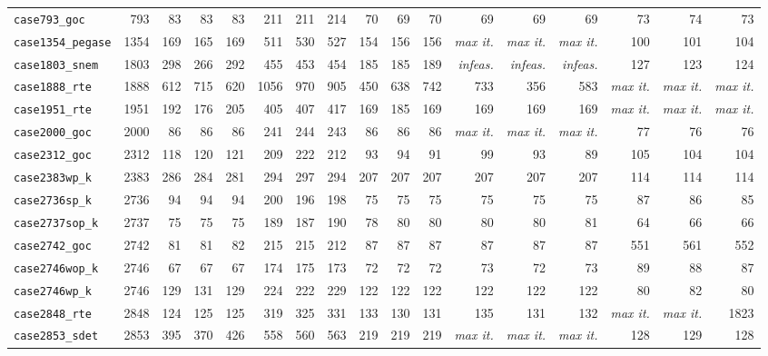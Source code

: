 {\begin{longtable}{lrrrrrrrrrrrrrrrr}
\texttt{case793\_goc} & 793 & 83 & 83 & 83 & 211 & 211 & 214 & 70 & 69 & 70 & 69 & 69 & 69 & 73 & 74 & 73 \\
\texttt{case1354\_pegase} & 1354 & 169 & 165 & 169 & 511 & 530 & 527 & 154 & 156 & 156 & \textit{max it.} & \textit{max it.} & \textit{max it.} & 100 & 101 & 104 \\
\texttt{case1803\_snem} & 1803 & 298 & 266 & 292 & 455 & 453 & 454 & 185 & 185 & 189 & \textit{infeas.} & \textit{infeas.} & \textit{infeas.} & 127 & 123 & 124 \\
\texttt{case1888\_rte} & 1888 & 612 & 715 & 620 & 1056 & 970 & 905 & 450 & 638 & 742 & 733 & 356 & 583 & \textit{max it.} & \textit{max it.} & \textit{max it.} \\
\texttt{case1951\_rte} & 1951 & 192 & 176 & 205 & 405 & 407 & 417 & 169 & 185 & 169 & 169 & 169 & 169 & \textit{max it.} & \textit{max it.} & \textit{max it.} \\
\texttt{case2000\_goc} & 2000 & 86 & 86 & 86 & 241 & 244 & 243 & 86 & 86 & 86 & \textit{max it.} & \textit{max it.} & \textit{max it.} & 77 & 76 & 76 \\
\texttt{case2312\_goc} & 2312 & 118 & 120 & 121 & 209 & 222 & 212 & 93 & 94 & 91 & 99 & 93 & 89 & 105 & 104 & 104 \\
\texttt{case2383wp\_k} & 2383 & 286 & 284 & 281 & 294 & 297 & 294 & 207 & 207 & 207 & 207 & 207 & 207 & 114 & 114 & 114 \\
\texttt{case2736sp\_k} & 2736 & 94 & 94 & 94 & 200 & 196 & 198 & 75 & 75 & 75 & 75 & 75 & 75 & 87 & 86 & 85 \\
\texttt{case2737sop\_k} & 2737 & 75 & 75 & 75 & 189 & 187 & 190 & 78 & 80 & 80 & 80 & 80 & 81 & 64 & 66 & 66 \\
\texttt{case2742\_goc} & 2742 & 81 & 81 & 82 & 215 & 215 & 212 & 87 & 87 & 87 & 87 & 87 & 87 & 551 & 561 & 552 \\
\texttt{case2746wop\_k} & 2746 & 67 & 67 & 67 & 174 & 175 & 173 & 72 & 72 & 72 & 73 & 72 & 73 & 89 & 88 & 87 \\
\texttt{case2746wp\_k} & 2746 & 129 & 131 & 129 & 224 & 222 & 229 & 122 & 122 & 122 & 122 & 122 & 122 & 80 & 82 & 80 \\
\texttt{case2848\_rte} & 2848 & 124 & 125 & 125 & 319 & 325 & 331 & 133 & 130 & 131 & 135 & 131 & 132 & \textit{max it.} & \textit{max it.} & 1823 \\
\texttt{case2853\_sdet} & 2853 & 395 & 370 & 426 & 558 & 560 & 563 & 219 & 219 & 219 & \textit{max it.} & \textit{max it.} & \textit{max it.} & 128 & 129 & 128 \\

\end{longtable}}
